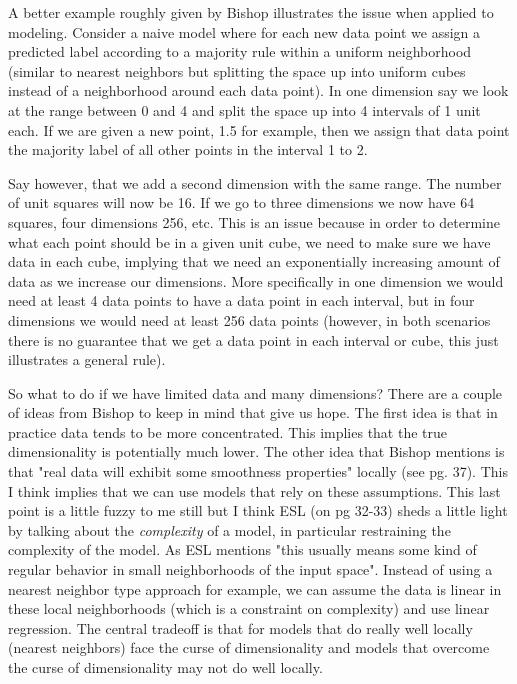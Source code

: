 A better example roughly given by Bishop illustrates the issue when applied to modeling. Consider a naive model where for each new data point we assign a predicted label according to a majority rule within a uniform neighborhood (similar to nearest neighbors but splitting the space up into uniform cubes instead of a neighborhood around each data point). In one dimension say we look at the range between 0 and 4 and split the space up into 4 intervals of 1 unit each. If we are given a new point, 1.5 for example, then we assign that data point the majority label of all other points in the interval 1 to 2. 

Say however, that we add a second dimension with the same range. The number of unit squares will now be 16. If we go to three dimensions we now have 64 squares, four dimensions 256, etc. This is an issue because in order to determine what each point should be in a given unit cube, we need to make sure we have data in each cube, implying that we need an exponentially increasing amount of data as we increase our dimensions. More specifically in one dimension we would need at least 4 data points to have a data point in each interval, but in four dimensions we would need at least 256 data points (however, in both scenarios there is no guarantee that we get a data point in each interval or cube, this just illustrates a general rule).

So what to do if we have limited data and many dimensions? There are a couple of ideas from Bishop to keep in mind that give us hope. The first idea is that in practice data tends to be more concentrated. This implies that the true dimensionality is potentially much lower. The other idea that Bishop mentions is that "real data will exhibit some smoothness properties" locally (see pg. 37). This I think implies that we can use models that rely on these assumptions. This last point is a little fuzzy to me still but I think ESL (on pg 32-33) sheds a little light by talking about the \emph{complexity} of a model, in particular restraining the complexity of the model. As ESL mentions "this usually means some kind of regular behavior in small neighborhoods of the input space". Instead of using a nearest neighbor type approach for example, we can assume the data is linear in these local neighborhoods (which is a constraint on complexity) and use linear regression. The central tradeoff is that for models that do really well locally (nearest neighbors) face the curse of dimensionality and models that overcome the curse of dimensionality may not do well locally.

